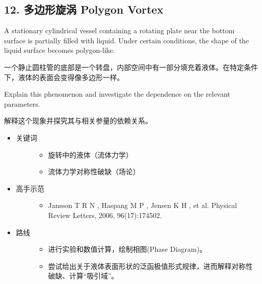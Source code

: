 \documentclass[a4paper,10pt,english]{sphinxmanual}
\begin{document}
\subsection{12. 多边形旋涡 Polygon Vortex}
\label{\detokenize{8. Appendix:polygon-vortex}}
A stationary cylindrical vessel containing a rotating plate near the bottom surface is partially filled with liquid. Under certain conditions, the shape of the liquid surface becomes polygon-like.

一个静止圆柱管的底部是一个转盘，内部空间中有一部分填充着液体。在特定条件下，液体的表面会变得像多边形一样。

Explain this phenomenon and investigate the dependence on the relevant parameters.

解释这个现象并探究其与相关参量的依赖关系。

\noindent{}
\begin{itemize}
\item {} \begin{description}
\item[{关键词}] \leavevmode\begin{itemize}
\item {} 
旋转中的液体（流体力学）

\item {} 
流体力学对称性破缺（场论）

\end{itemize}

\end{description}

\item {} \begin{description}
\item[{高手示范}] \leavevmode\begin{itemize}
\item {} 
Jansson T R N , Haspang M P , Jensen K H , et al.  Physical Review Letters, 2006, 96(17):174502.

\end{itemize}

\end{description}

\item {} \begin{description}
\item[{路线}] \leavevmode\begin{itemize}
\item {} 
进行实验和数值计算，绘制相图(Phase Diagram)。

\item {} 
尝试给出关于液体表面形状的泛函极值形式规律，进而解释对称性破缺、计算“吸引域”。

\end{itemize}

\end{description}

\end{itemize}
\end{document}
